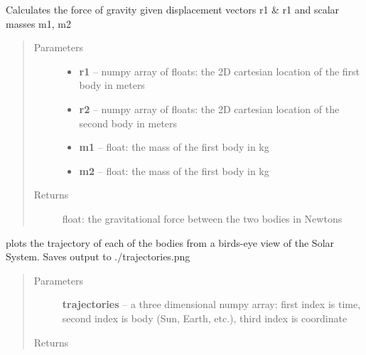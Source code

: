 \documentclass[letterpaper,10pt,english]{sphinxmanual}
\begin{document}

\begin{fulllineitems}
\label{index:orbital.force_gravity}
Calculates the force of gravity given displacement vectors r1 \& r1
and scalar masses m1, m2
\begin{quote}\begin{description}
\item[{Parameters}] \leavevmode\begin{itemize}
\item {} 
\textbf{r1} -- numpy array of floats: the 2D cartesian location of the first body in meters

\item {} 
\textbf{r2} -- numpy array of floats: the 2D cartesian location of the second body in meters

\item {} 
\textbf{m1} -- float:  the mass of the first body in kg

\item {} 
\textbf{m2} -- float:  the mass of the first body in kg

\end{itemize}

\item[{Returns}] \leavevmode
float: the gravitational force between the two bodies in Newtons

\end{description}\end{quote}

\end{fulllineitems}


\begin{fulllineitems}
\label{index:orbital.plot_orbit}
plots the trajectory of each of the bodies from a birds-eye view of the Solar System. Saves output to ./trajectories.png
\begin{quote}\begin{description}
\item[{Parameters}] \leavevmode
\textbf{trajectories} -- a three dimensional numpy array: first index is time, second index is body (Sun, Earth, etc.), third index is coordinate

\item[{Returns}] \leavevmode
{}

\end{description}\end{quote}

\end{fulllineitems}
\end{document}
